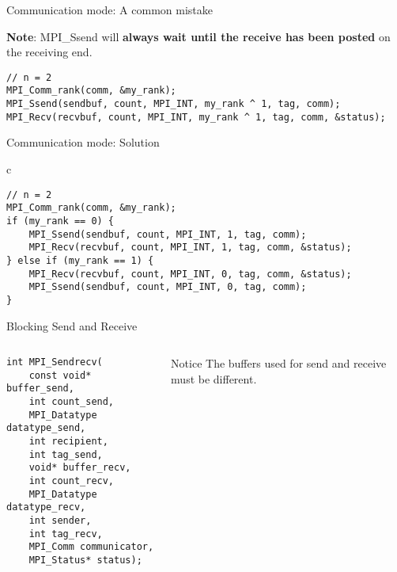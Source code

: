 \begin{frame}[fragile]{Communication mode: A common mistake}

    \textbf{Note}: MPI\_Ssend will \textbf{always wait until the receive has been posted} on the receiving end.
    \begin{verbatim}
// n = 2
MPI_Comm_rank(comm, &my_rank);
MPI_Ssend(sendbuf, count, MPI_INT, my_rank ^ 1, tag, comm);
MPI_Recv(recvbuf, count, MPI_INT, my_rank ^ 1, tag, comm, &status);
      \end{verbatim}


\end{frame}

\begin{frame}[fragile]{Communication mode: Solution}
    \begin{tabular}{c}
      \begin{verbatim}
// n = 2
MPI_Comm_rank(comm, &my_rank);
if (my_rank == 0) {
    MPI_Ssend(sendbuf, count, MPI_INT, 1, tag, comm);
    MPI_Recv(recvbuf, count, MPI_INT, 1, tag, comm, &status);
} else if (my_rank == 1) {
    MPI_Recv(recvbuf, count, MPI_INT, 0, tag, comm, &status);
    MPI_Ssend(sendbuf, count, MPI_INT, 0, tag, comm);
}
      \end{verbatim}
    \end{tabular}

\end{frame}

\begin{frame}[fragile]{Blocking Send and Receive}
\begin{columns}
    
\begin{column}{.5\textwidth}
\begin{verbatim}
int MPI_Sendrecv(
    const void* buffer_send,      
    int count_send,
    MPI_Datatype datatype_send,
    int recipient,
    int tag_send,
    void* buffer_recv,
    int count_recv,
    MPI_Datatype datatype_recv,
    int sender,
    int tag_recv,
    MPI_Comm communicator,
    MPI_Status* status);
\end{verbatim}
\end{column}

\begin{column}{.5\textwidth}
\begin{block}{Notice}
    The buffers used for send and receive must be different.
\end{block}


\end{column}
\end{columns}
\end{frame}


